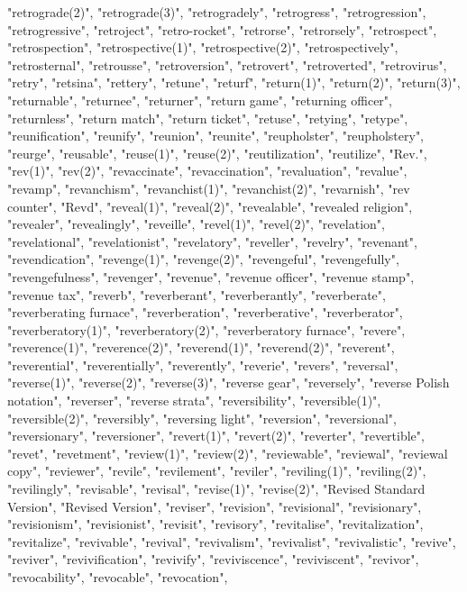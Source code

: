 "retrograde(2)",
"retrograde(3)",
"retrogradely",
"retrogress",
"retrogression",
"retrogressive",
"retroject",
"retro-rocket",
"retrorse",
"retrorsely",
"retrospect",
"retrospection",
"retrospective(1)",
"retrospective(2)",
"retrospectively",
"retrosternal",
"retrousse",
"retroversion",
"retrovert",
"retroverted",
"retrovirus",
"retry",
"retsina",
"rettery",
"retune",
"returf",
"return(1)",
"return(2)",
"return(3)",
"returnable",
"returnee",
"returner",
"return game",
"returning officer",
"returnless",
"return match",
"return ticket",
"retuse",
"retying",
"retype",
"reunification",
"reunify",
"reunion",
"reunite",
"reupholster",
"reupholstery",
"reurge",
"reusable",
"reuse(1)",
"reuse(2)",
"reutilization",
"reutilize",
"Rev.",
"rev(1)",
"rev(2)",
"revaccinate",
"revaccination",
"revaluation",
"revalue",
"revamp",
"revanchism",
"revanchist(1)",
"revanchist(2)",
"revarnish",
"rev counter",
"Revd",
"reveal(1)",
"reveal(2)",
"revealable",
"revealed religion",
"revealer",
"revealingly",
"reveille",
"revel(1)",
"revel(2)",
"revelation",
"revelational",
"revelationist",
"revelatory",
"reveller",
"revelry",
"revenant",
"revendication",
"revenge(1)",
"revenge(2)",
"revengeful",
"revengefully",
"revengefulness",
"revenger",
"revenue",
"revenue officer",
"revenue stamp",
"revenue tax",
"reverb",
"reverberant",
"reverberantly",
"reverberate",
"reverberating furnace",
"reverberation",
"reverberative",
"reverberator",
"reverberatory(1)",
"reverberatory(2)",
"reverberatory furnace",
"revere",
"reverence(1)",
"reverence(2)",
"reverend(1)",
"reverend(2)",
"reverent",
"reverential",
"reverentially",
"reverently",
"reverie",
"revers",
"reversal",
"reverse(1)",
"reverse(2)",
"reverse(3)",
"reverse gear",
"reversely",
"reverse Polish notation",
"reverser",
"reverse strata",
"reversibility",
"reversible(1)",
"reversible(2)",
"reversibly",
"reversing light",
"reversion",
"reversional",
"reversionary",
"reversioner",
"revert(1)",
"revert(2)",
"reverter",
"revertible",
"revet",
"revetment",
"review(1)",
"review(2)",
"reviewable",
"reviewal",
"reviewal copy",
"reviewer",
"revile",
"revilement",
"reviler",
"reviling(1)",
"reviling(2)",
"revilingly",
"revisable",
"revisal",
"revise(1)",
"revise(2)",
"Revised Standard Version",
"Revised Version",
"reviser",
"revision",
"revisional",
"revisionary",
"revisionism",
"revisionist",
"revisit",
"revisory",
"revitalise",
"revitalization",
"revitalize",
"revivable",
"revival",
"revivalism",
"revivalist",
"revivalistic",
"revive",
"reviver",
"revivification",
"revivify",
"reviviscence",
"reviviscent",
"revivor",
"revocability",
"revocable",
"revocation",
